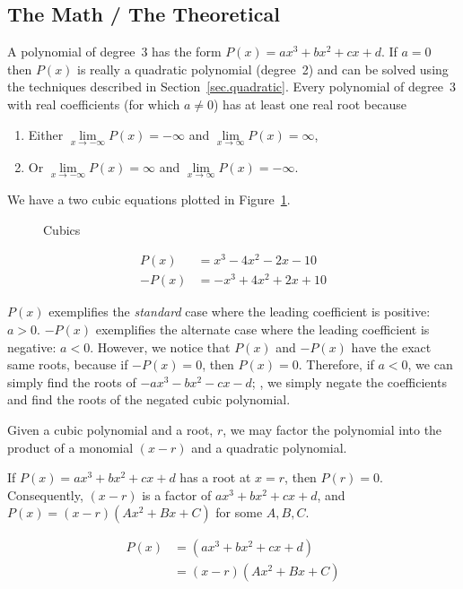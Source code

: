 \subsection{The Math / The Theoretical}
\label{sec.cubic.math}
A polynomial of degree~3 has the form $P(x) = a x^3 + b x^2 + c x +d$.
If $a=0$ then $P(x)$ is really a quadratic polynomial (degree~2)
and can be solved using the techniques described in
Section~\ref{sec.quadratic}.  Every polynomial of degree~3 with real
coefficients (for which $a\neq 0$) has at least one real root because
\begin{enumerate}
\item Either $\lim\limits_{x\to-\infty}P(x) = -\infty$ and $\lim\limits_{x\to\infty}P(x) = \infty$,
  \item Or $\lim\limits_{x\to-\infty}P(x) = \infty$ and $\lim\limits_{x\to\infty}P(x) = -\infty$.
\end{enumerate}


We have a two cubic equations plotted in Figure~\ref{fig.cubic}.

\begin{figure}
  \centering

  \caption{Cubics}
  \label{fig.cubic}
\end{figure}

\begin{align*}
  P(x) &= x^3 - 4 x^2 - 2 x - 10\\
  -P(x) &= -x^3 + 4 x^2 + 2 x + 10
\end{align*}

$P(x)$ exemplifies the \emph{standard} case where the leading coefficient is positive: $a>0$.
$-P(x)$ exemplifies the alternate case where the leading coefficient is negative: $a<0$.
However, we notice that $P(x)$ and $-P(x)$ have the exact same roots, because if $-P(x) = 0$,
then $P(x) = 0$.  Therefore, if $a<0$, we can simply find the roots of $-a x^3 -b x^2 - c x - d$;
\ie, we simply negate the coefficients and find the roots of the negated cubic polynomial.




Given a cubic polynomial and a root, $r$, we may factor the polynomial into
the product of a monomial $(x-r)$ and a quadratic polynomial.

If $P(x) = a x^3 + b x^2 + c x + d$ has a root at $x=r$, then $P(r)=0$.
Consequently, $(x-r)$ is a factor of $a x^3 + b x^2 + c x + d$, and
$P(x) = (x-r)(A x^2 + B x + C)$ for some $A, B, C$.  

\begin{align}
  P(x) &=  (a x^3 + b x^2 + c x + d)\nonumber\\
  &= (x-r) (A x^2 + B x + C)\label{eq.factor.ABC}
\end{align}

